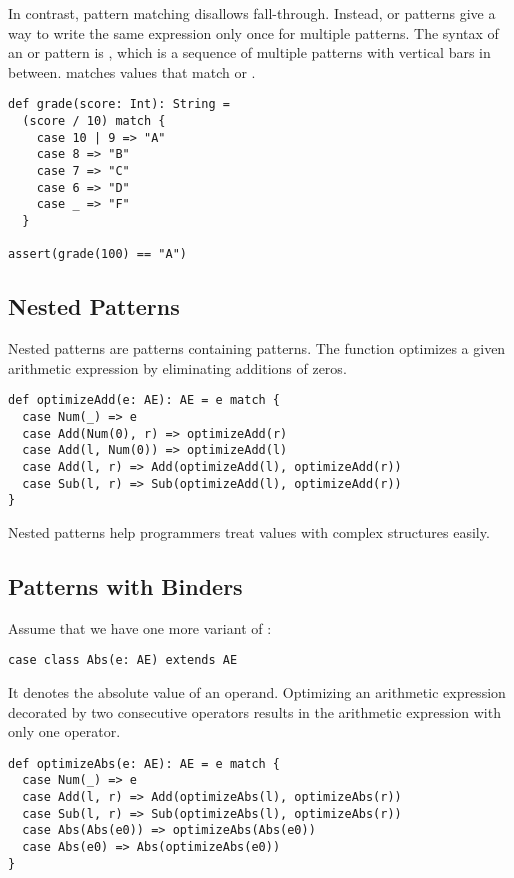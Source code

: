 In contrast, pattern matching disallows fall-through. Instead, or patterns
give a way to write the same expression only once for multiple patterns. The
syntax of an or pattern is , which is a sequence
of multiple patterns with vertical bars in between.  matches values
that match  or .

\begin{verbatim}
def grade(score: Int): String =
  (score / 10) match {
    case 10 | 9 => "A"
    case 8 => "B"
    case 7 => "C"
    case 6 => "D"
    case _ => "F"
  }

assert(grade(100) == "A")
\end{verbatim}

\subsection{Nested Patterns}

Nested patterns are patterns containing patterns.
The  function
optimizes a given arithmetic expression by eliminating additions of zeros.

\begin{verbatim}
def optimizeAdd(e: AE): AE = e match {
  case Num(_) => e
  case Add(Num(0), r) => optimizeAdd(r)
  case Add(l, Num(0)) => optimizeAdd(l)
  case Add(l, r) => Add(optimizeAdd(l), optimizeAdd(r))
  case Sub(l, r) => Sub(optimizeAdd(l), optimizeAdd(r))
}
\end{verbatim}

Nested patterns help programmers treat values with complex structures easily.

\subsection{Patterns with Binders}

Assume that we have one more variant of :

\begin{verbatim}
case class Abs(e: AE) extends AE
\end{verbatim}

It denotes the absolute value of an operand.
Optimizing an arithmetic expression decorated by two
consecutive  operators results in the arithmetic expression with only
one  operator.

\begin{verbatim}
def optimizeAbs(e: AE): AE = e match {
  case Num(_) => e
  case Add(l, r) => Add(optimizeAbs(l), optimizeAbs(r))
  case Sub(l, r) => Sub(optimizeAbs(l), optimizeAbs(r))
  case Abs(Abs(e0)) => optimizeAbs(Abs(e0))
  case Abs(e0) => Abs(optimizeAbs(e0))
}
\end{verbatim}

